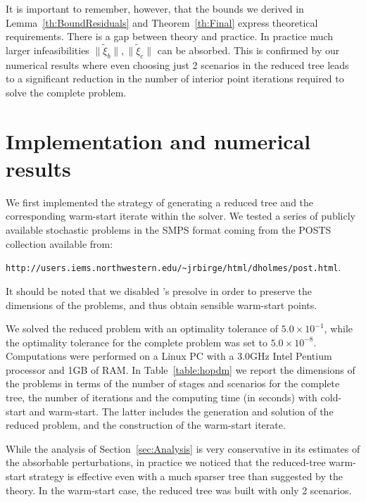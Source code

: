 It is important to remember, however,
that the bounds we derived in Lemma~\ref{th:BoundResiduals}
and Theorem~\ref{th:Final} express theoretical requirements.
There is a gap between theory and
practice. In practice much larger infeasibilities 
$\|\tilde{\xi}_b\|, \|\tilde{\xi}_c\|$ can be absorbed. This is
confirmed by our numerical results where even choosing just 2
scenarios in the reduced tree leads to a significant reduction in the
number of interior point iterations required to solve the complete problem.


%
%
\section{Implementation and numerical results}
\label{sec:Results}

We first implemented the strategy of generating a reduced tree and 
the corresponding warm-start iterate within the \HOPDM \cite{Gondzio96} 
solver. We tested a series of publicly available stochastic problems in 
the SMPS format \cite{SMPS} coming from the POSTS collection 
available from:
\begin{center}
{\tt http://users.iems.northwestern.edu/\~{}jrbirge/html/dholmes/post.html}.
\end{center}
%
%
It should be noted that we disabled \HOPDM's presolve %
in order to preserve the dimensions of the problems, and thus obtain 
sensible warm-start points.

We solved the reduced problem with an optimality tolerance of 
$5.0\times 10^{-1}$, while the optimality tolerance for the complete 
problem was set to $5.0\times 10^{-8}$. 
Computations were performed on a Linux PC with a 3.0GHz Intel Pentium 
processor and 1GB of RAM.
In Table~\ref{table:hopdm} we report the dimensions of the problems 
in terms of the number of stages and scenarios for the complete 
tree, the number of iterations and the computing time (in seconds) 
with cold-start and warm-start. The latter includes the generation 
and solution of the reduced problem, and the construction of the 
warm-start iterate.

While the analysis of Section~\ref{sec:Analysis} is very conservative
in its estimates of the absorbable perturbations, in practice we noticed
that the reduced-tree warm-start strategy is effective even with
a much sparser tree than suggested by the theory.
In the warm-start case, the reduced tree was built with only 2 scenarios.

